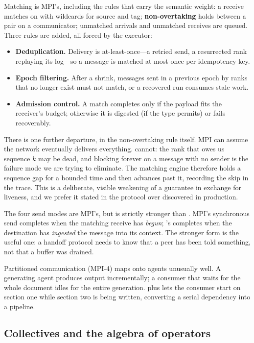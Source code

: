 Matching is MPI's, including the rules that carry the semantic weight: a
receive matches on  with wildcards for source
and tag; \textbf{non-overtaking} holds between a pair on a communicator;
unmatched arrivals and unmatched receives are queued. Three rules are added,
all forced by the executor:

\begin{itemize}
\item \textbf{Deduplication.} Delivery is at-least-once---a retried send, a
resurrected rank replaying its log---so a message is matched at most once
per idempotency key.
\item \textbf{Epoch filtering.} After a shrink, messages sent in a previous
epoch by ranks that no longer exist must not match, or a recovered run
consumes stale work.
\item \textbf{Admission control.} A match completes only if the payload fits
the receiver's budget; otherwise it is digested (if the type permits) or
fails recoverably.
\end{itemize}

There is one further departure, in the non-overtaking rule itself. MPI can
assume the network eventually delivers everything. \ampi{} cannot: the rank
that owes us sequence $k$ may be dead, and blocking forever on a message
with no sender is the failure mode we are trying to eliminate. The matching
engine therefore holds a sequence gap for a bounded time and then advances
past it, recording the skip in the trace. This is a deliberate, visible
weakening of a guarantee in exchange for liveness, and we prefer it stated
in the protocol over discovered in production.

The four send modes are MPI's, but  is strictly stronger than
. MPI's synchronous send completes when the matching receive
has \emph{begun}; \ampi{}'s completes when the destination has
\emph{ingested} the message into its context. The stronger form is the
useful one: a handoff protocol needs to know that a peer has been told
something, not that a buffer was drained.

Partitioned communication (MPI-4) maps onto agents unusually well. A
generating agent produces output incrementally; a consumer that waits for
the whole document idles for the entire generation.  plus
 lets the consumer start on section one while section two is
being written, converting a serial dependency into a pipeline.

\subsection{Collectives and the algebra of operators}
\label{sec:ops}

